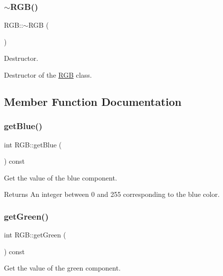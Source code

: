 \subsubsection{\texorpdfstring{$\sim$\+R\+G\+B()}{~RGB()}}
{\footnotesize\ttfamily R\+G\+B\+::$\sim$\+R\+GB (\begin{DoxyParamCaption}{ }\end{DoxyParamCaption})\hspace{0.3cm}{\ttfamily [virtual]}}



Destructor. 

Destructor of the \mbox{\hyperlink{class_r_g_b}{R\+GB}} class. 

\subsection{Member Function Documentation}
\mbox{\label{class_r_g_b_a57f129e128bd774563f62832a4ae1094}} 
\subsubsection{\texorpdfstring{get\+Blue()}{getBlue()}}
{\footnotesize\ttfamily int R\+G\+B\+::get\+Blue (\begin{DoxyParamCaption}{ }\end{DoxyParamCaption}) const}



Get the value of the blue component. 

\begin{DoxyReturn}{Returns}
An integer between 0 and 255 corresponding to the blue color. 
\end{DoxyReturn}
\mbox{\label{class_r_g_b_a7d01d041dd60756e58ba4af9a9b1a521}} 
\subsubsection{\texorpdfstring{get\+Green()}{getGreen()}}
{\footnotesize\ttfamily int R\+G\+B\+::get\+Green (\begin{DoxyParamCaption}{ }\end{DoxyParamCaption}) const}



Get the value of the green component. 

